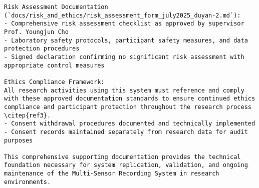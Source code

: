 \begin{verbatim}
Risk Assessment Documentation (`docs/risk_and_ethics/risk_assessment_form_july2025_duyan-2.md`):
- Comprehensive risk assessment checklist as approved by supervisor Prof. Youngjun Cho
- Laboratory safety protocols, participant safety measures, and data protection procedures
- Signed declaration confirming no significant risk assessment with appropriate control measures

Ethics Compliance Framework:
All research activities using this system must reference and comply with these approved documentation standards to ensure continued ethics compliance and participant protection throughout the research process \citep{ref3}.
- Consent withdrawal procedures documented and technically implemented
- Consent records maintained separately from research data for audit purposes

This comprehensive supporting documentation provides the technical foundation necessary for system replication, validation, and ongoing maintenance of the Multi-Sensor Recording System in research environments.
\end{verbatim}
